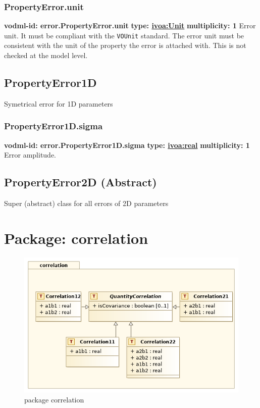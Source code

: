     \subsubsection{PropertyError.unit}
      \textbf{vodml-id: error.PropertyError.unit} \newline
      \textbf{type: \hyperref[sect:ivoa]{ivoa:Unit}} \newline
      \textbf{multiplicity: 1} \newline 
      Error unit. It must be compliant with the \texttt{VOUnit} standard. The error unit must be consistent with the unit of the property the error is attached with. This is not checked at the model level.

  \subsection{PropertyError1D}
  \label{sect:error.PropertyError1D}
    Symetrical error for 1D parameters

    \subsubsection{PropertyError1D.sigma}
      \textbf{vodml-id: error.PropertyError1D.sigma} \newline
      \textbf{type: \hyperref[sect:ivoa]{ivoa:real}} \newline
      \textbf{multiplicity: 1} \newline 
      Error amplitude.

  \subsection{PropertyError2D (Abstract)}
  \label{sect:error.PropertyError2D}
    Super (abstract) class for all errors of 2D parameters

\pagebreak
\section{Package: correlation }
  \begin{figure}[h]
    \includegraphics[width=1.0\textwidth]{../model/correlation.png}
    \caption{package correlation}
    \label{fig:correlation}
  \end{figure}



